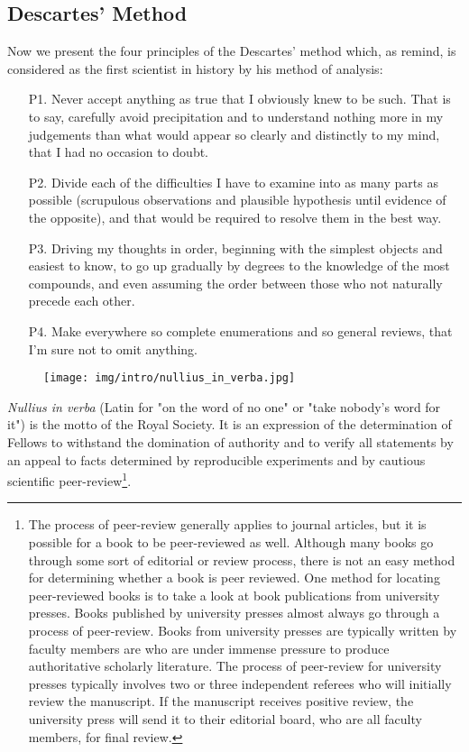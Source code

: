 	\subsection{Descartes' Method}
	Now we present the four principles of the Descartes' method which, as remind, is considered as the first scientist in history by his method of analysis:
	\begin{itemize}
		\item[P1.] Never accept anything as true that I obviously knew to be such. That is to say, carefully avoid precipitation and to understand nothing more in my judgements than what would appear so clearly and distinctly to my mind, that I had no occasion to doubt.
		
		\item[P2.] Divide each of the difficulties I have to examine into as many parts as possible (scrupulous observations and plausible hypothesis until evidence of the opposite), and that would be required to resolve them in the best way.
		
		\item[P3.] Driving my thoughts in order, beginning with the simplest objects and easiest to know, to go up gradually by degrees to the knowledge of the most compounds, and even assuming the order between those who not naturally precede each other.
		
		\item[P4.] Make everywhere so complete enumerations and so general reviews, that I'm sure not to omit anything.
	\end{itemize}
	\begin{figure}[H]
		\centering
		\texttt{[image: img/intro/nullius\_in\_verba.jpg]}
	\end{figure}
	\textit{Nullius in verba} (Latin for "on the word of no one" or "take nobody's word for it") is the motto of the Royal Society.  It is an expression of the determination of Fellows to withstand the domination of authority and to verify all statements by an appeal to facts determined by reproducible experiments and by cautious scientific peer-review\footnote{The process of peer-review generally applies to journal articles, but it is possible for a book to be peer-reviewed as well. Although many books go through some sort of editorial or review process, there is not an easy method for determining whether a book is peer reviewed. One method for locating peer-reviewed books is to take a look at book publications from university presses. Books published by university presses almost always go through a process of peer-review. Books from university presses are typically written by faculty members are who are under immense pressure to produce authoritative scholarly literature. The process of peer-review for university presses typically involves two or three independent referees who will initially review the manuscript. If the manuscript receives positive review, the university press will send it to their editorial board, who are all faculty members, for final review.}.

